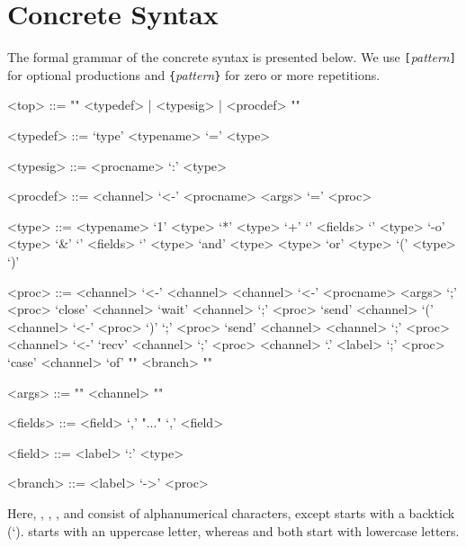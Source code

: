 
\chapter{Concrete Syntax}

The formal grammar of the concrete syntax is presented below. We use \texttt{[}\textit{pattern}\texttt{]} for optional productions and \texttt{\{}\textit{pattern}\texttt{\}} for zero or more repetitions.


\begin{grammar}
  <top> ::= "{" <typedef> | <typesig> | <procdef> "}"

  <typedef> ::= `type' <typename> `=' <type>

  <typesig> ::= <procname> `:' <type>

  <procdef> ::= <channel> `<-' <procname> <args> `=' <proc>


  <type> ::= <typename>
         \alt `1'
         \alt <type> `*' <type>
         \alt `+' `{' <fields> `}'
         \alt <type> `-o' <type>
         \alt `&' `{' <fields> `}'
         \alt <type> `and' <type>
         \alt <type> `or' <type>
         \alt `(' <type> `)'

  <proc> ::= <channel> `<-' <channel>
         \alt <channel> `<-' <procname> <args> `;' <proc>
         \alt `close' <channel>
         \alt `wait' <channel> `;' <proc>
         \alt `send' <channel> `(' <channel> `<-' <proc> `)' `;' <proc>
         \alt `send' <channel> <channel> `;' <proc>
         \alt <channel> `<-' `recv' <channel> `;' <proc>
         \alt <channel> `.' <label> `;' <proc>
         \alt `case' <channel> `of' "{" <branch> "}"


  <args> ::= "{" <channel> "}"

  <fields> ::= <field> `,' "..." `,' <field>

  <field> ::= <label> `:' <type>

  <branch> ::= <label> `->' <proc>
\end{grammar}

Here, , , , and  consist of alphanumerical characters, except  starts with a backtick (`).  starts with an uppercase letter, whereas  and  both start with lowercase letters.

